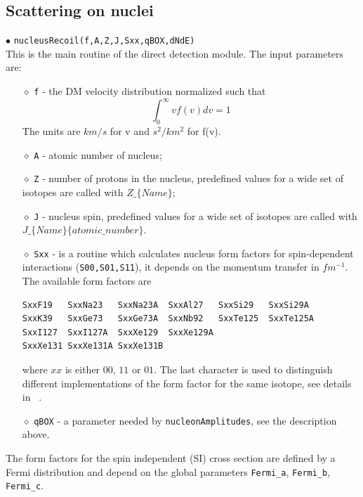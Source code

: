 \documentclass[12pt,a4paper]{article}
\begin{document}
 


\subsection{Scattering on nuclei}
\label{DDforNucleus}
$\bullet$ \verb|nucleusRecoil(f,A,Z,J,Sxx,qBOX,dNdE)|\\
This is the main routine of the  direct detection module. The
input parameters are:
\begin{itemize}
\item[$\diamond$]
\verb|f| -  the DM velocity distribution   normalized such that 
$$ \int_0^{\infty} v f(v) dv =1$$ 
The units  are $km/s$ for v and $s^2/km^2$ for  f(v).
\item[$\diamond$]
\verb|A| - atomic number of nucleus;
\item[$\diamond$]
\verb|Z| - number of protons in the nucleus, predefined values for a wide set of isotopes 
are called with $Z\_\{Name\}$;
\item[$\diamond$]
\verb|J| - nucleus spin,  predefined values for a wide set of isotopes
are called with\\
 $J\_\{Name\}\{atomic\_number\}$.
\item[$\diamond$]
\verb|Sxx| - is a routine which calculates nucleus form factors for
spin-dependent interactions (\verb|S00,S01,S11|), it depends  on the momentum
transfer in $fm^{-1}$. The available form factors are
\begin{verbatim}
SxxF19   SxxNa23   SxxNa23A  SxxAl27   SxxSi29   SxxSi29A  
SxxK39   SxxGe73   SxxGe73A  SxxNb92   SxxTe125  SxxTe125A 
SxxI127  SxxI127A  SxxXe129  SxxXe129A 
SxxXe131 SxxXe131A SxxXe131B
\end{verbatim}
where $xx$ is either $00$, $11$ or $01$.  The last character 
is used to distinguish different implementations of
the form factor for the same isotope, see details in ~\cite{Belanger:2008sj}.
\item[$\diamond$]
\verb|qBOX| - a parameter needed by \verb|nucleonAmplitudes|, see the description above.
\end{itemize}
The form factors for the spin independent (SI) cross section are defined by a Fermi distribution
and depend on the global parameters \verb|Fermi_a|, \verb|Fermi_b|,
\verb|Fermi_c|. 
\end{document}

